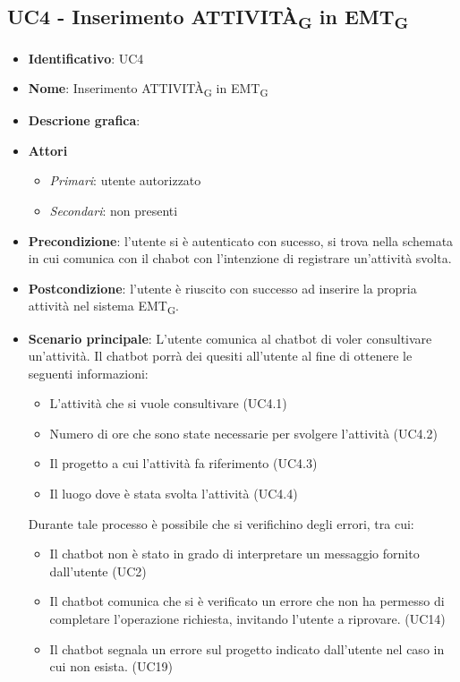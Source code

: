 \subsection{UC4 - Inserimento ATTIVITÀ\textsubscript{G} in EMT\textsubscript{G}}
\begin{itemize}
    \item \textbf{Identificativo}: UC4 
    \item \textbf{Nome}: Inserimento ATTIVITÀ\textsubscript{G} in EMT\textsubscript{G}
    \item \textbf{Descrione grafica}:
    \item \textbf{Attori}
    \begin{itemize} 
        \item \textit{Primari}: utente autorizzato
        \item \textit{Secondari}: non presenti
    \end{itemize}
 \item \textbf{Precondizione}: l'utente si è autenticato con sucesso, si trova nella schemata in cui comunica con il chabot con l'intenzione di registrare un'attività svolta. 
 \item \textbf{Postcondizione}: l'utente è riuscito con successo ad inserire la propria attività nel sistema EMT\textsubscript{G}.  
 \item \textbf{Scenario principale}: L'utente comunica al chatbot di voler consultivare un'attività. Il chatbot porrà dei quesiti all'utente al fine di ottenere le seguenti informazioni: 
    \begin{itemize}
        \item L'attività che si vuole consultivare (UC4.1)
        \item Numero di ore che sono state necessarie per svolgere l'attività (UC4.2)
        \item Il progetto a cui l'attività fa riferimento (UC4.3)
        \item Il luogo dove è stata svolta l'attività (UC4.4)
    \end{itemize}
 Durante tale processo è possibile che si verifichino degli errori, tra cui: 
    \begin{itemize}
        \item Il chatbot non è stato in grado di interpretare un messaggio fornito dall'utente (UC2)
        \item Il chatbot comunica che si è verificato un errore che non ha permesso di completare l'operazione richiesta, invitando l'utente a riprovare. (UC14)
        \item Il chatbot segnala un errore sul progetto indicato dall'utente nel caso in cui non esista. (UC19)
    \end{itemize}
\end{itemize}

